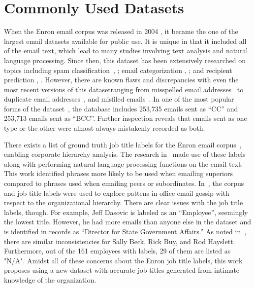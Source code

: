 \documentclass[12pt]{report}
\begin{document}
\section{Commonly Used Datasets}
When the Enron email corpus was released in 2004 \cite{klimt_introducing_2004}, it became the one of the largest email datasets available for public use.
It is unique in that it included all of the email text, which lead to many studies involving text analysis and natural language processing. 
Since then, this dataset has been extensively researched on topics including spam classification~\cite{gaber_e-mail_2016}, \cite{shams_classifying_2013}; email categorization \cite{he_novel_2014}, \cite{keila_structure_2005}; and recipient prediction \cite{sofershtein_predicting_2015}, \cite{hu_towards_2012}.
However, there are known flaws and discrepancies with even the most recent versions of this dataset\textemdash{}ranging from misspelled email addresses~\cite{nordbo_data_2014} to duplicate email addresses~\cite{waterman_big_2014}, and misfiled emails~\cite{namata_inferring_2006}.
In one of the most popular forms of the dataset~\cite{shetty_enron_2004}, the database includes 253,735 emails sent as ``CC'' and  253,713 emails sent as ``BCC''.
Further inspection reveals that emails sent as one type or the other were almost always mistakenly recorded as both.

There exists a list of ground truth job title labels for the Enron email corpus~\cite{shetty_status_2004}, enabling corporate hierarchy analysis.
The research in~\cite{gilbert_phrases_2012} made use of these labels along with performing natural language processing functions on the email text.
This work identified phrases more likely to be used when emailing superiors compared to phrases used when emailing peers or subordinates.
In~\cite{mitra_analyzing_2013}, the corpus and job title labels were used to explore pattens in office email gossip with respect to the organizational hierarchy.
There are clear issues with the job title labels, though.
For example, Jeff Dasovic is labeled as an “Employee”, seemingly the lowest title.
However, he had more emails than anyone else in the dataset and is identified in records as “Director for State Government Affairs.” 
As noted in~\cite{gilbert_phrases_2012}, there are similar inconsistencies for Sally Beck, Rick Buy, and Rod Hayslett.
Furthermore, out of the 161 employees with labels, 29 of them are listed as "N/A".
Amidst all of these concerns about the Enron job title labels, this work proposes using a new dataset with accurate job titles generated from intimate knowledge of the organization.
\end{document}

